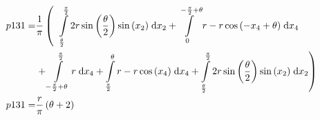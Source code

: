\begin{align}
    p131 =&\frac{1}{\pi} \left(\;\;\int\limits_{\frac{\theta}{2}}^{\frac{\pi}{2}}2 r \sin{\left (\frac{\theta}{2} \right )} \sin{\left (x_{2} \right )}\;\mathrm{d}x_{2}+\int\limits_{0}^{- \frac{\pi}{2} + \theta}r - r \cos{\left (- x_{4} + \theta \right )}\;\mathrm{d}x_{4}\right.\notag\\
 &\left.+\int\limits_{- \frac{\pi}{2} + \theta}^{\frac{\pi}{2}}r\;\mathrm{d}x_{4}+\int\limits_{\frac{\pi}{2}}^{\theta}r - r \cos{\left (x_{4} \right )}\;\mathrm{d}x_{4}+\int\limits_{\frac{\theta}{2}}^{\frac{\pi}{2}}2 r \sin{\left (\frac{\theta}{2} \right )} \sin{\left (x_{2} \right )}\;\mathrm{d}x_{2}\right)\label{p131Def}\\
    p131 =& \frac{r}{\pi} \left(\theta + 2\right)\label{p131Sln}
\end{align}